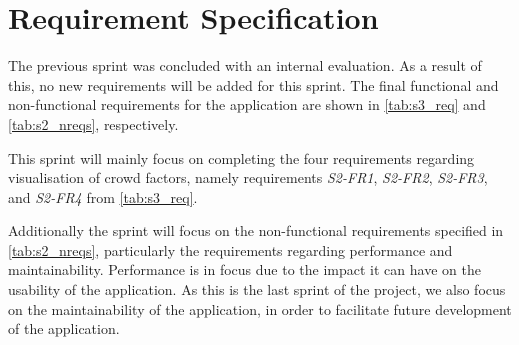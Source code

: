\section{Requirement Specification} \label{sec:s4_reqs}
The previous sprint was concluded with an internal evaluation. As a result of this, no new requirements will be added for this sprint. The final functional and non-functional requirements for the application are shown in \cref{tab:s3_req} and \cref{tab:s2_nreqs}, respectively.

This sprint will mainly focus on completing the four requirements regarding visualisation of crowd factors, namely requirements \emph{S2-FR1}, \emph{S2-FR2}, \emph{S2-FR3}, and \emph{S2-FR4} from \cref{tab:s3_req}.

Additionally the sprint will focus on the non-functional requirements specified in \cref{tab:s2_nreqs}, particularly the requirements regarding performance and maintainability. Performance is in focus due to the impact it can have on the usability of the application. As this is the last sprint of the project, we also focus on the maintainability of the application, in order to facilitate future development of the application.